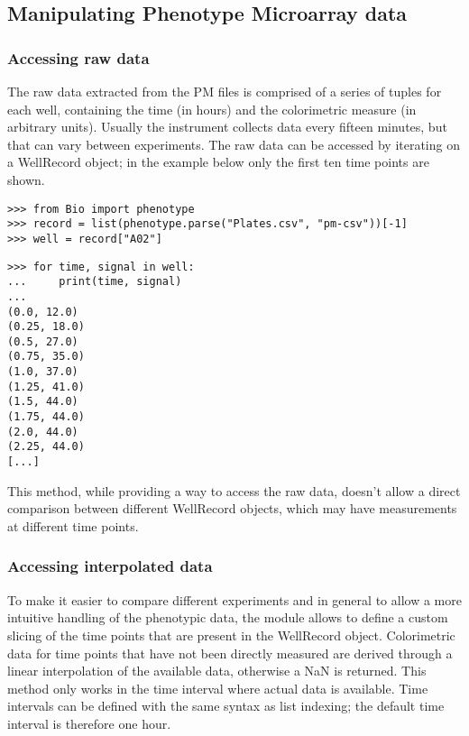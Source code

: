 \subsection{Manipulating Phenotype Microarray data}

\subsubsection{Accessing raw data}
The raw data extracted from the PM files is comprised of a series of tuples for each well,
containing the time (in hours) and the colorimetric measure (in arbitrary units).
Usually the instrument collects data every fifteen minutes, but that can vary between
experiments. The raw data can be accessed by iterating on a WellRecord object;
in the example below only the first ten time points are shown.

\begin{verbatim}
>>> from Bio import phenotype
>>> record = list(phenotype.parse("Plates.csv", "pm-csv"))[-1]
>>> well = record["A02"]
\end{verbatim}
\begin{verbatim}
>>> for time, signal in well:
...     print(time, signal)
...
(0.0, 12.0)
(0.25, 18.0)
(0.5, 27.0)
(0.75, 35.0)
(1.0, 37.0)
(1.25, 41.0)
(1.5, 44.0)
(1.75, 44.0)
(2.0, 44.0)
(2.25, 44.0)
[...]
\end{verbatim}

This method, while providing a way to access the raw data, doesn't allow a direct
comparison between different WellRecord objects, which may have measurements at
different time points.

\subsubsection{Accessing interpolated data}
To make it easier to compare different experiments and in general to allow a more intuitive handling
of the phenotypic data, the module allows to define a custom slicing of the time points that are present
in the WellRecord object. Colorimetric data for time points that have not been directly measured are
derived through a linear interpolation of the available data, otherwise a NaN is returned.
This method only works in the time interval where actual data is available.
Time intervals can be defined with the same syntax as list
indexing; the default time interval is therefore one hour.

